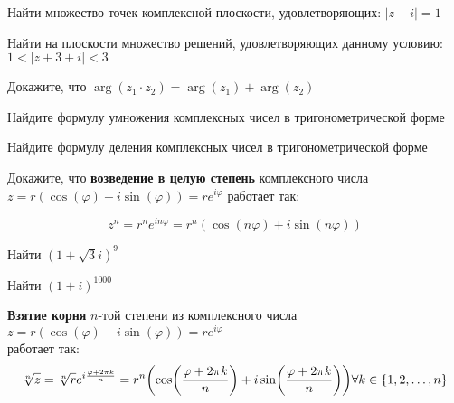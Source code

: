 \documentclass{article}
\begin{document}
    \begin{task_boxed}
        Найти множество точек комплексной плоскости, удовлетворяющих: $|z-i| = 1$
    \end{task_boxed}

    \begin{task_boxed}
        Найти на плоскости множество решений, удовлетворяющих данному условию: $1 < |z + 3 + i| < 3$
    \end{task_boxed}

    \begin{task_boxed}
        Докажите, что $\arg(z_1 \cdot z_2) = \arg(z_1) + \arg(z_2)$
    \end{task_boxed}

    \begin{task_boxed}
        Найдите формулу умножения комплексных чисел в тригонометрической форме
    \end{task_boxed}

    \begin{task_boxed}
        Найдите формулу деления комплексных чисел в тригонометрической форме
    \end{task_boxed}

    \begin{task_boxed}
        Докажите, что \textbf{возведение в целую степень} комплексного числа $z = r(\cos(\varphi) + i \sin(\varphi)) = re^{i\varphi}$ работает так:

        \[z^n = r^n e^{in\varphi} = r^n(\cos(n\varphi) + i \sin(n\varphi))\]
    \end{task_boxed}

    \begin{task_boxed}
        Найти $(1 + \sqrt{3}i)^{9}$
    \end{task_boxed}

    \begin{task_boxed}
        Найти $(1 + i)^{1000}$
    \end{task_boxed}

    \begin{definition_boxed}
        \textbf{Взятие корня} $n$-той степени из комплексного числа $z = r(\cos(\varphi) + i \sin(\varphi)) = re^{i\varphi}$\\
        работает так:
        \[\sqrt[n]{z} = \sqrt[n]{r} e^{i\frac{\varphi + 2\pi k}{n}} = r^n\lr*{\cos\lr*{\frac{\varphi + 2\pi k}{n}} + i \sin\lr*{\frac{\varphi + 2\pi k}{n}}} \forall k \in \{1,2,\dotsc, n\}\]
    \end{definition_boxed}
\end{document}
